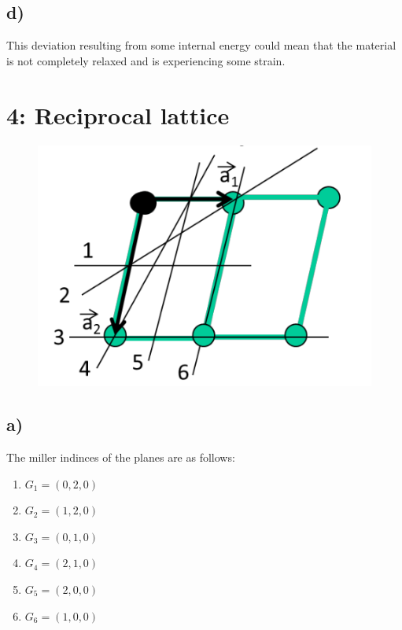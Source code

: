 \documentclass[a4paper, 11pt]{article}
\begin{document}
		\subsection*{d)}
			This deviation resulting from some internal energy could mean that the material is not completely relaxed and is experiencing some strain.
	\newpage
	\section*{4: Reciprocal lattice}
		\begin{figure}[H]
			\centering
			\includegraphics[width = 0.7\linewidth]{lattice.png}
		\end{figure}
		\subsection*{a)}
			The miller indinces of the planes are as follows:\\
			\begin{enumerate}
				\item $G_1 = (0,2,0)$
				\item $G_2 = (1,2,0)$
				\item $G_3 = (0,1,0)$
				\item $G_4 = (2,1,0)$
				\item $G_5 = (2,0,0)$
				\item $G_6 = (1,0,0)$
			\end{enumerate}
\end{document}
